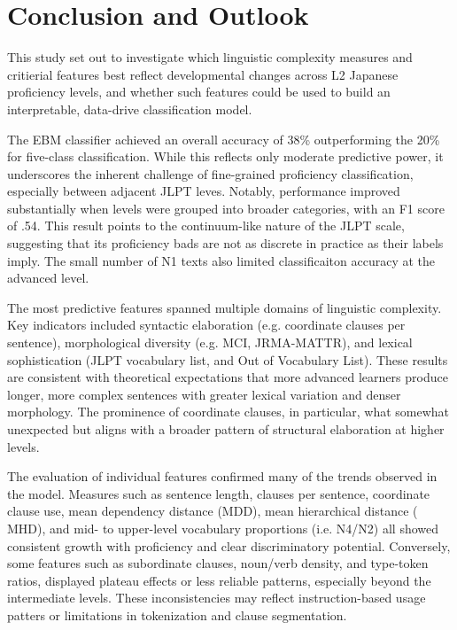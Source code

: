 \chapter{Conclusion and Outlook}
This study set out to investigate which linguistic complexity measures and critierial features best reflect
developmental changes across L2 Japanese proficiency levels, and whether such features could be used to build an
interpretable, data-drive classification model.



The EBM classifier achieved an overall accuracy of 38\% outperforming the 20\% for five-class classification. While
this reflects only moderate predictive power, it underscores the inherent challenge of fine-grained proficiency
classification, especially between adjacent JLPT leves. Notably, performance improved substantially when levels were
grouped into broader categories, with an F1 score of .54. This result points to the continuum-like nature of the
JLPT scale, suggesting that its proficiency bads are not as discrete in practice as their labels imply. The small
number of N1 texts also limited classificaiton accuracy at the advanced level.

The most predictive features spanned multiple domains of linguistic complexity. Key indicators included syntactic
elaboration (e.g. coordinate clauses per sentence), morphological diversity (e.g. MCI, JRMA-MATTR), and lexical
sophistication (JLPT vocabulary list, and Out of Vocabulary List). These results are consistent with theoretical
expectations that more advanced learners produce longer, more complex sentences with greater lexical variation and
denser morphology. The prominence of coordinate clauses, in particular, what somewhat unexpected but aligns with a
broader pattern of structural elaboration at higher levels.

The evaluation of individual features confirmed many of the trends observed in the model. Measures such as sentence
length, clauses per sentence, coordinate clause use, mean dependency distance (MDD), mean hierarchical distance (
MHD), and mid- to upper-level vocabulary proportions (i.e. N4/N2) all showed consistent growth with proficiency and
clear discriminatory potential. Conversely, some features such as subordinate clauses, noun/verb density, and
type-token ratios, displayed plateau effects or less reliable patterns, especially beyond the intermediate levels.
These inconsistencies may reflect instruction-based usage patters or limitations in tokenization and clause
segmentation.

